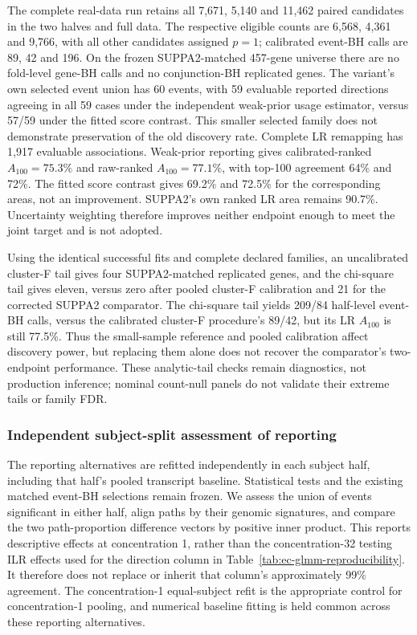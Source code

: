 \documentclass[11pt]{article}
\begin{document}
The complete real-data run retains all 7,671, 5,140 and 11,462 paired candidates in the two halves and full data. The respective eligible counts are 6,568, 4,361 and 9,766, with all other candidates assigned \(p=1\); calibrated event-BH calls are 89, 42 and 196. On the frozen SUPPA2-matched 457-gene universe there are no fold-level gene-BH calls and no conjunction-BH replicated genes. The variant's own selected event union has 60 events, with 59 evaluable reported directions agreeing in all 59 cases under the independent weak-prior usage estimator, versus 57/59 under the fitted score contrast. This smaller selected family does not demonstrate preservation of the old discovery rate. Complete LR remapping has 1,917 evaluable associations. Weak-prior reporting gives calibrated-ranked \(A_{100}=75.3\%\) and raw-ranked \(A_{100}=77.1\%\), with top-100 agreement 64\% and 72\%. The fitted score contrast gives 69.2\% and 72.5\% for the corresponding areas, not an improvement. SUPPA2's own ranked LR area remains 90.7\%. Uncertainty weighting therefore improves neither endpoint enough to meet the joint target and is not adopted.

Using the identical successful fits and complete declared families, an uncalibrated cluster-F tail gives four SUPPA2-matched replicated genes, and the chi-square tail gives eleven, versus zero after pooled cluster-F calibration and 21 for the corrected SUPPA2 comparator. The chi-square tail yields 209/84 half-level event-BH calls, versus the calibrated cluster-F procedure's 89/42, but its LR \(A_{100}\) is still 77.5\%. Thus the small-sample reference and pooled calibration affect discovery power, but replacing them alone does not recover the comparator's two-endpoint performance. These analytic-tail checks remain diagnostics, not production inference; nominal count-null panels do not validate their extreme tails or family FDR.

\subsubsection*{Independent subject-split assessment of reporting}

The reporting alternatives are refitted independently in each subject half, including that half's pooled transcript baseline. Statistical tests and the existing matched event-BH selections remain frozen. We assess the union of events significant in either half, align paths by their genomic signatures, and compare the two path-proportion difference vectors by positive inner product. This reports descriptive effects at concentration 1, rather than the concentration-32 testing ILR effects used for the direction column in Table~\ref{tab:ec-glmm-reproducibility}. It therefore does not replace or inherit that column's approximately 99\% agreement. The concentration-1 equal-subject refit is the appropriate control for concentration-1 pooling, and numerical baseline fitting is held common across these reporting alternatives.
\end{document}
